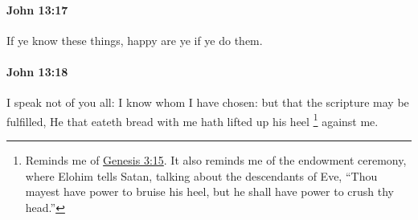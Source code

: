 		\paragraph{John 13:17} %
			\label{JOHN-13-17}

			If ye know these things, happy are ye if ye do them.

			\begin{framed}
				\scriptsize
				\begin{compactdesc}
					\item[SBLG] 
				\end{compactdesc}
			\end{framed}

		\paragraph{John 13:18} %
			\label{JOHN-13-18}

			I speak not of you all: I know whom I have chosen: but that the scripture may be fulfilled, He that eateth bread with me hath lifted up his heel%
				\footnote{%
					Reminds me of \hyperref[GENESIS-3-15]{Genesis 3:15}. It also reminds me of the endowment ceremony, where Elohim tells Satan, talking about the descendants of Eve, ``Thou mayest have power to bruise his heel, but he shall have power to crush thy head.''
					}
			against me.


